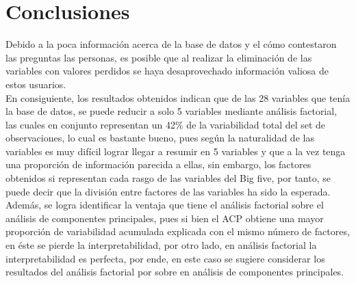 \documentclass{report}
\begin{document}
\chapter{Conclusiones}
Debido a la poca información acerca de la base de datos y el cómo contestaron las preguntas las personas, es posible que al realizar la eliminación de las variables con valores perdidos se haya desaprovechado información valiosa de estos usuarios.\\

En consiguiente, los resultados obtenidos indican que de las 28 variables que tenía la base de datos, se puede reducir a solo 5 variables mediante análisis factorial, las cuales en conjunto representan un 42\% de la variabilidad total del set de observaciones, lo cual es bastante bueno, pues según la naturalidad de las variables es muy difícil lograr llegar a resumir en 5 variables y que a la vez tenga una proporción de información parecida a ellas, sin embargo, los factores obtenidos si representan cada rasgo de las variables del Big five, por tanto, se puede decir que la división entre factores de las variables ha sido la esperada.\\

Además, se logra identificar la ventaja que tiene el análisis factorial sobre el análisis de componentes principales, pues si bien el ACP obtiene una mayor proporción de variabilidad acumulada explicada con el mismo número de factores, en éste se pierde la interpretabilidad, por otro lado, en análisis factorial la interpretabilidad es perfecta, por ende, en este caso se sugiere considerar los resultados del análisis factorial por sobre en análisis de componentes principales.\\
\end{document}
